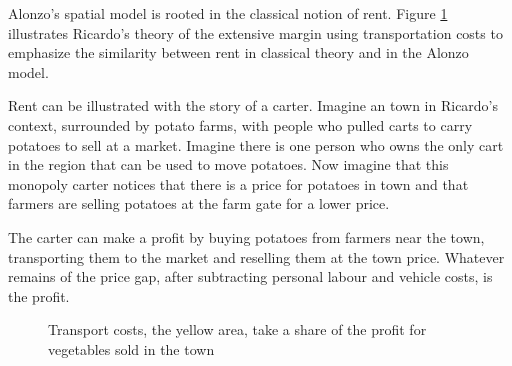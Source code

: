 Alonzo's spatial model is rooted in the classical notion of rent. 
Figure \ref{fig-rent-ricardo} illustrates Ricardo's theory of the extensive margin using transportation costs to emphasize the similarity between rent in classical theory and in the Alonzo model. 


Rent  can be illustrated with the story of a carter.
Imagine an  town in Ricardo's context, surrounded by potato farms, with people who pulled carts to carry potatoes to sell at a market. 
Imagine there is one person who owns the only cart in the region that can be used to move potatoes. Now imagine that this monopoly carter notices that there is a price for potatoes in town and that farmers are selling potatoes at the farm gate for a lower price. 

The carter can make a profit by buying potatoes from farmers near the town, transporting them to the market and reselling them at the town price. Whatever remains of the price gap, after subtracting personal labour and vehicle costs, is the profit.  

\begin{figure}[htb]
    \begin{center}
    
    \caption{Transport costs, the yellow area, take a share of the profit for vegetables sold in the town}
    \label{fig-rent-ricardo}
    \end{center}
\end{figure}


